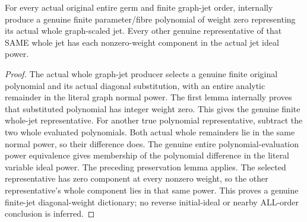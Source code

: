 \begin{theorem}
\label{hir:relative-normal-graph-weight-whole-scaled-jet}
\leanok
For every actual original entire germ and finite graph-jet order, internally produce a genuine finite parameter/fibre polynomial of weight zero representing its actual whole graph-scaled jet. Every other genuine representative of that SAME whole jet has each nonzero-weight component in the actual jet ideal power.
\end{theorem}
\begin{proof}
The actual whole graph-jet producer selects a genuine finite original polynomial and its actual diagonal substitution, with an entire analytic remainder in the literal graph normal power. The first lemma internally proves that substituted polynomial has integer weight zero. This gives the genuine finite whole-jet representative. For another true polynomial representative, subtract the two whole evaluated polynomials. Both actual whole remainders lie in the same normal power, so their difference does. The genuine entire polynomial-evaluation power equivalence gives membership of the polynomial difference in the literal variable ideal power. The preceding preservation lemma applies. The selected representative has zero component at every nonzero weight, so the other representative's whole component lies in that same power. This proves a genuine finite-jet diagonal-weight dictionary; no reverse initial-ideal or nearby ALL-order conclusion is inferred.
\end{proof}
